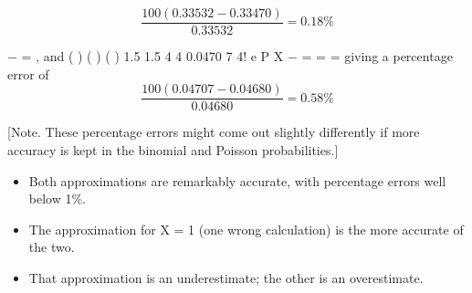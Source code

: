 \documentclass[a4paper,12pt]{article}
\begin{document}
\begin{enumerate}
\[\frac{100(0.33532 - 0.33470)}{0.33532} = 0.18\%\]

−
= , and
( ) ( ) ( )
1.5 1.5 4
4 0.0470 7
4!
e
P X
−
= = =
giving a percentage error of 
\[\frac{100(0.04707  - 0.04680)}{0.04680} = 0.58\%\]

[Note. These percentage errors might come out slightly differently if more
accuracy is kept in the binomial and Poisson probabilities.]
\begin{itemize}
    \item Both approximations are remarkably accurate, with percentage errors well
below 1\%. 
\item The approximation for X = 1 (one wrong calculation) is the more
accurate of the two. 
\item That approximation is an underestimate; the other is an
overestimate.
\end{itemize}

\end{enumerate}
\end{document}
